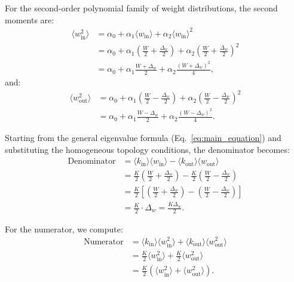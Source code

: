 \documentclass[a4paper,pre,superscriptaddress,floatfix,nofootinbib,twocolumn]{revtex4-1}
\begin{document}
For the second-order polynomial family of weight distributions, the second moments are:
\begin{align*}
\langle w^2_\text{in} \rangle &= \alpha_0 + \alpha_1 \langle w_\text{in} \rangle + \alpha_2 \langle w_\text{in} \rangle^2\\
&= \alpha_0 + \alpha_1 \left(\frac{W}{2} + \frac{\Delta_{w}}{2}\right) + \alpha_2 \left(\frac{W}{2} + \frac{\Delta_{w}}{2}\right)^2\\
&= \alpha_0 + \alpha_1 \frac{W + \Delta_{w}}{2} + \alpha_2 \frac{(W + \Delta_{w})^2}{4},
\end{align*}
and:
\begin{align*}
\langle w^2_\text{out} \rangle &= \alpha_0 + \alpha_1 \left(\frac{W}{2} - \frac{\Delta_{w}}{2}\right) + \alpha_2 \left(\frac{W}{2} - \frac{\Delta_{w}}{2}\right)^2\\
&= \alpha_0 + \alpha_1 \frac{W - \Delta_{w}}{2} + \alpha_2 \frac{(W - \Delta_{w})^2}{4}.
\end{align*}

Starting from the general eigenvalue formula (Eq.~\eqref{eq:main_equation}) and substituting the homogeneous topology conditions, the denominator becomes:
\begin{align*}
\text{Denominator} &= \langle k_{\text{in}} \rangle \langle w_\text{in} \rangle - \langle k_{\text{out}} \rangle \langle w_\text{out} \rangle\\
&= \frac{K}{2} \left(\frac{W}{2} + \frac{\Delta_{w}}{2}\right) - \frac{K}{2} \left(\frac{W}{2} - \frac{\Delta_{w}}{2}\right)\\
&= \frac{K}{2} \left[\left(\frac{W}{2} + \frac{\Delta_{w}}{2}\right) - \left(\frac{W}{2} - \frac{\Delta_{w}}{2}\right)\right]\\
&= \frac{K}{2} \cdot \Delta_{w} = \frac{K\Delta_{w}}{2}.
\end{align*}

For the numerator, we compute:
\begin{align*}
\text{Numerator} &= \langle k_{\text{in}} \rangle \langle w^2_\text{in} \rangle + \langle k_{\text{out}} \rangle \langle w^2_\text{out} \rangle\\
&= \frac{K}{2} \langle w^2_\text{in} \rangle + \frac{K}{2} \langle w^2_\text{out} \rangle\\
&= \frac{K}{2} \left(\langle w^2_\text{in} \rangle + \langle w^2_\text{out} \rangle\right).
\end{align*}
\end{document}
